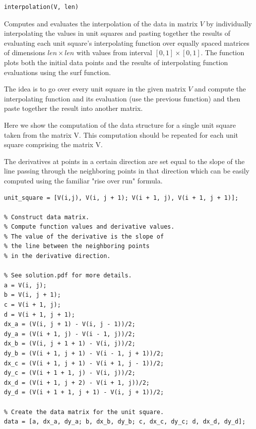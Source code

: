 \documentclass[fleqn]{article}
\begin{document}
\begin{tcolorbox}
\begin{verbatim}
interpolation(V, len)
\end{verbatim}
\end{tcolorbox}

Computes and evaluates the interpolation of the data in matrix $V$ by individually
interpolating the values in unit squares and pasting together the results of evaluating each
unit square's interpolating function over equally spaced matrices of dimensions $len \times len$ with values from interval $[0, 1] \times [0, 1]$. The function plots both the initial data points and the results of interpolating function evaluations using the surf function.

The idea is to go over every unit square in the given matrix $V$ and compute the interpolating function and its evaluation (use the previous function) and then paste together the result into another matrix.

Here we show the computation of the data structure for a single unit square taken from the matrix V. This computation should be repeated for each unit square comprising the matrix V. 

The derivatives at points in a certain direction are set equal to the slope of the line passing through the neighboring points in that direction which can be easily computed using the familiar "rise over run" formula.
\begin{small}
\begin{tcolorbox}
\begin{verbatim}
unit_square = [V(i,j), V(i, j + 1); V(i + 1, j), V(i + 1, j + 1)];
      
% Construct data matrix.
% Compute function values and derivative values.
% The value of the derivative is the slope of 
% the line between the neighboring points
% in the derivative direction.

% See solution.pdf for more details.
a = V(i, j);
b = V(i, j + 1);
c = V(i + 1, j);
d = V(i + 1, j + 1);
dx_a = (V(i, j + 1) - V(i, j - 1))/2;
dy_a = (V(i + 1, j) - V(i - 1, j))/2;
dx_b = (V(i, j + 1 + 1) - V(i, j))/2;
dy_b = (V(i + 1, j + 1) - V(i - 1, j + 1))/2;
dx_c = (V(i + 1, j + 1) - V(i + 1, j - 1))/2;
dy_c = (V(i + 1 + 1, j) - V(i, j))/2;
dx_d = (V(i + 1, j + 2) - V(i + 1, j))/2;
dy_d = (V(i + 1 + 1, j + 1) - V(i, j + 1))/2;
      
% Create the data matrix for the unit square.
data = [a, dx_a, dy_a; b, dx_b, dy_b; c, dx_c, dy_c; d, dx_d, dy_d];
\end{verbatim}
\end{tcolorbox}
\end{small}
\end{document}
